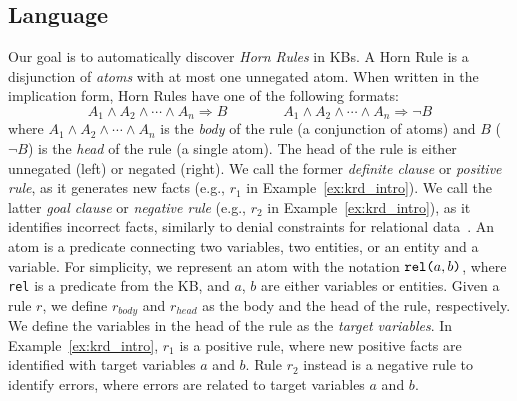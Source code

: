 \subsection{Language} \label{sec:krd_language} 
\vspace{-0.2ex}
Our goal is to automatically discover 
\emph{Horn Rules} in KBs. A Horn Rule is a disjunction of \emph{atoms} with at most one unnegated atom. When written in the implication form, Horn Rules have one of the following formats:
%
\begin{equation*}
	A_1 \wedge A_2 \wedge \cdots \wedge A_n \Rightarrow B \qquad \qquad A_1 \wedge A_2 \wedge \cdots \wedge A_n \Rightarrow  \neg B
\end{equation*} %
%
where $A_1 \wedge A_2 \wedge \cdots \wedge A_n$ is the \emph{body} of the rule (a conjunction of atoms) and $B$ ($\neg B$) is the \emph{head} of the rule (a single atom). The head of the rule is either unnegated (left) or negated (right). We call the former \emph{definite clause} or \emph{positive rule}, as it generates new 
facts (e.g., $r_1$ in Example~\ref{ex:krd_intro}). We call the latter \emph{goal clause} or \emph{negative rule} (e.g., $r_2$ in Example~\ref{ex:krd_intro}), as it identifies incorrect facts, similarly to denial constraints for relational data~\cite{chu2013discovering}. %
An atom is a predicate connecting two variables, two entities, or an entity and a variable. For simplicity, we represent an atom with the notation $\texttt{rel(}a,b\texttt{)}$, where \texttt{rel} is a predicate from the KB, and $a$, $b$ are either variables or entities. 
Given a rule $r$, we define $r_{body}$ and $r_{head}$ as the body and the head of the rule, respectively. We define the variables in the head of the rule as the \emph{target variables}. 
In Example~\ref{ex:krd_intro}, $r_1$ is a positive rule, where new positive facts are identified with target variables $a$ and $b$.
Rule $r_2$ instead is a negative rule to identify errors, where errors are related to target variables $a$ and $b$.
